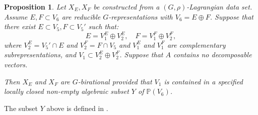 \documentclass[11pt]{amsart}
\theoremstyle{plain}
\newtheorem{proposition}[theorem]{Proposition}
\numberwithin{equation}{section}
\theoremstyle{definition}
\theoremstyle{remark}
\newcommand{\bP}{\mathbb{P}}
\begin{document}
\begin{proposition}\label{pBirationalityConstruction}
    Let $X_E, X_F$ be constructed from a $(G,\rho)$-Lagrangian data set. Assume $E, F\subset V_6$ are reducible $G$-representations with $V_6=E\oplus F$. Suppose that there exist $E\subset V_5, F\subset V_5'$ such that:
\begin{equation}\label{G-reps}
    E=V_1^E \oplus V_2^E, \quad F=V_1^F\oplus V_2^F,
\end{equation} where $V_2^E = V_5'\cap E$ and $V_2^F= F \cap V_5$ and $V_1^E$ and $V_1^F$ are complementary subrepresentations, and $V_1 \subset V_2^E \oplus V_2^F$.
    Suppose that $A$ contains no decomposable vectors. 
    
    Then $X_E$ and $X_F$ are $G$-birational provided that $V_1$ is contained in a specified locally closed non-empty algebraic subset $Y$ of $\bP(V_6)$. 
\end{proposition}
The subset $Y$ above is defined in \cite[Proof of Thm. 4.15 and Appendix (B.2)]{DK1}.
\end{document}

